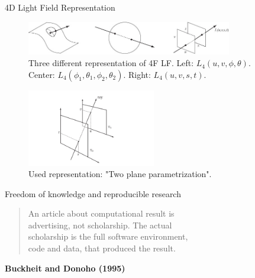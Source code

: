 \begin{frame}{4D Light Field Representation}
\begin{figure}[h!]
\includegraphics[width=0.8\textwidth]{../../Diagrams/Light-field-parametrizations.jpg}
\caption{Three different representation of 4F LF\@. Left: $L_4(u,v,\phi,\theta)$. Center: $L_4(\phi_1,\theta_1,\phi_2,\theta_2)$. Right: $L_4(u,v,s,t)$.}
\end{figure}
\pause
\begin{figure}[h!]
\centering
\includegraphics[width=0.5\textwidth]{../../Diagrams/two-planes_param.jpg}
\caption{Used representation: "Two plane parametrization".}
\label{fig:C2S0F3}
\end{figure}
\end{frame}

\begin{frame}{Freedom of knowledge and reproducible research}

\begin{quote}
An article about computational result is \\
advertising, not scholarship. The actual \\
scholarship is the full software environment,\\
code and data, that produced the result.
\end{quote}
\begin{flushright}
\textbf{Buckheit and Donoho (1995)}
\end{flushright}
\end{frame}

